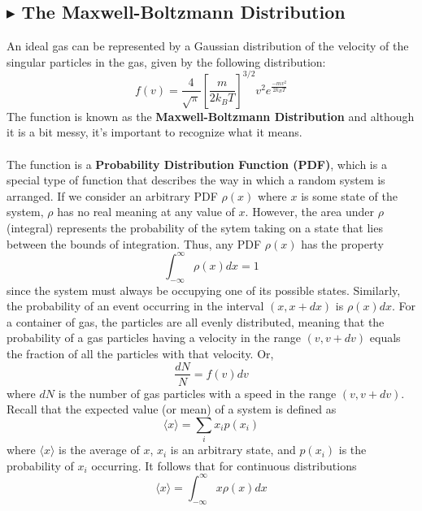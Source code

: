\subsection{\color{Orchid} $\blacktriangleright$ \color{black} The Maxwell-Boltzmann Distribution}\label{2.1.1}
An ideal gas can be represented by a Gaussian distribution of the velocity of the singular particles in the gas, given by the following distribution:
\begin{equation}
    f(v) = \frac{4}{\sqrt{\pi}}\left[\frac{m}{2k_BT}\right]^{3/2}v^2e^{\frac{-mv^2}{2k_BT}}
\end{equation}
\noindent The function is known as the \textbf{Maxwell-Boltzmann Distribution} and although it is a bit messy, it's important to recognize what it means. \\
\\
\noindent The function is a \textbf{Probability Distribution Function (PDF)}, which is a special type of function that describes the way in which a random system is arranged. If we consider an arbitrary PDF $\rho(x)$ where $x$ is some state of the system, $\rho$ has no real meaning at any value of $x$. However, the area under $\rho$ (integral) represents the probability of the sytem taking on a state that lies between the bounds of integration. Thus, any PDF $\rho(x)$ has the property
\begin{equation}
    \int_{-\infty}^{\infty} \rho(x) dx = 1
\end{equation}
\noindent since the system must always be occupying one of its possible states. Similarly, the probability of an event occurring in the interval $(x,x+dx)$ is $\rho(x) dx$. For a container of gas, the particles are all evenly distributed, meaning that the probability of a gas particles having a velocity in the range $(v,v+dv)$ equals the fraction of all the particles with that velocity. Or,
\begin{equation}
    \frac{dN}{N} = f(v) dv
\end{equation}
\noindent where $dN$ is the number of gas particles with a speed in the range $(v, v+dv)$. Recall that the expected value (or mean) of a system is defined as
\begin{equation*}
    \langle x \rangle = \sum_i x_i p(x_i)
\end{equation*}
\noindent where $\langle x\rangle$ is the average of $x$, $x_i$ is an arbitrary state, and $p(x_i)$ is the probability of $x_i$ occurring. It follows that for continuous distributions 
\begin{equation}
    \langle x\rangle = \int_{-\infty}^{\infty} x \rho(x) dx
\end{equation}
